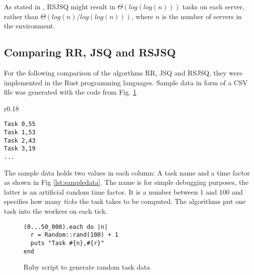 As stated in \cite{powerOfTwoRandomChoices}, \ac{RSJSQ} might result in
$\Theta(log(log(n)))$ tasks on each server, rather than
$\Theta(log(n) / log(log(n)))$, where $n$ is the number of servers in the
environment.

\subsection{Comparing RR, \ac{JSQ} and \ac{RSJSQ}}

For the following comparison of the algorthms \ac{RR}, \ac{JSQ} and \ac{RSJSQ},
they were implemented in the Rust programming languages.
Sample data in form of a CSV file was generated with the code from
Fig. \ref{lst:ruby}

\begin{wrapfigure}{r}{0.18\textwidth}
    \begin{lstlisting}
Task 0,55
Task 1,53
Task 2,43
Task 3,19
...
    \end{lstlisting}
    \caption{Sample data}
    \label{lst:sampledata}
\end{wrapfigure}

The sample data holds two values in each column: A task name and a time factor as shown in
Fig \ref{lst:sampledata}.
The name is for simple debugging purposes, the latter is an artificial random
time factor.
It is a number between $1$ and $100$ and specifies how many \emph{ticks} the
task takes to be computed.
The algorithms put one task into the workers on each tick.

\begin{figure}[b!]
    \begin{lstlisting}
(0...50_000).each do |n|
  r = Random::rand(100) + 1
  puts "Task #{n},#{r}"
end
    \end{lstlisting}
    \caption{Ruby script to generate random task data}
    \label{lst:ruby}
\end{figure}

